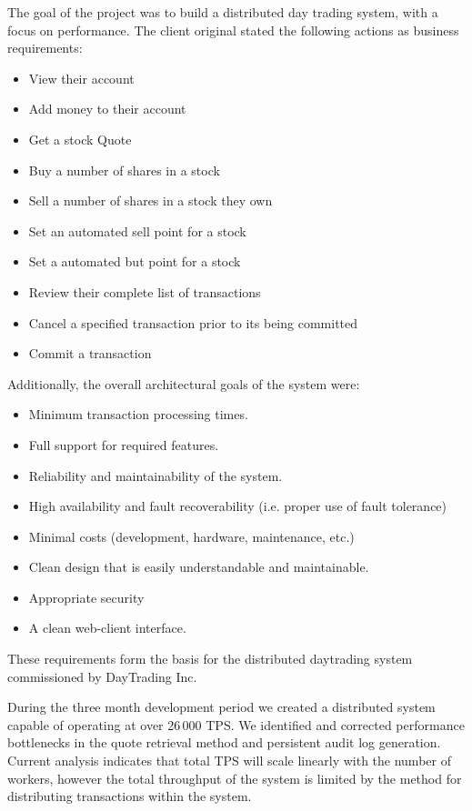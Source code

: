 \begin{Overview}

The goal of the project was to build a distributed day trading system, with a focus on performance. The client original stated the following actions as business requirements:

\begin{itemize}
  \item View their account
  \item Add money to their account
  \item Get a stock Quote
  \item Buy a number of shares in a stock
  \item Sell a number of shares in a stock they own
  \item Set an automated sell point for a stock
  \item Set a automated but point for a stock
  \item Review their complete list of transactions
  \item Cancel a specified transaction prior to its being committed
  \item Commit a transaction
\end{itemize} 

Additionally, the overall architectural goals of the system were:
\begin{itemize}
  \item Minimum transaction processing times. 
  \item Full support for required features. 
  \item Reliability and maintainability of the system. 
  \item High availability and fault recoverability (i.e. proper use of fault tolerance) 
  \item Minimal costs (development, hardware, maintenance, etc.) 
  \item Clean design that is easily understandable and maintainable. 
  \item Appropriate security 
  \item A clean web-client interface. 
\end{itemize}

These requirements form the basis for the distributed daytrading system commissioned by DayTrading Inc.

During the three month development period we created a distributed system capable of operating at over 26\,000 TPS.
We identified and corrected performance bottlenecks in the quote retrieval method and persistent audit log generation.
Current analysis indicates that total TPS will scale linearly with the number of workers, however the total throughput of the system is limited by the method for distributing transactions within the system.



\end{Overview}
